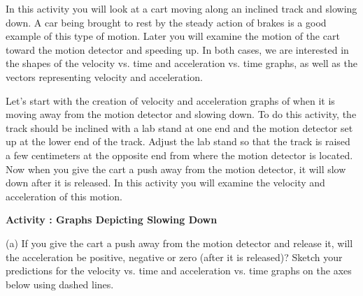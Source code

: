 In this activity you will look at a cart moving along an inclined track and
slowing down. A car being brought to rest by the steady action of brakes is
a good example of this type of motion. Later you will examine the motion of
the cart toward the motion detector and speeding up. In both cases, we are interested
in the shapes of the velocity vs. time and acceleration vs. time graphs, as
well as the vectors representing velocity and acceleration. 

Let's start with the creation of velocity and acceleration graphs of when it
is moving away from the motion detector and slowing down. To do this activity,
the track should be inclined with a lab stand at one end and the motion detector set up at the lower end of the track. Adjust the lab stand so that the track is raised a few centimeters at the opposite end from where the motion detector is located. Now when you give the cart a push away from the motion detector, it will slow down after it is released. In this activity you will examine the velocity and acceleration of this motion.

\textbf{Activity : Graphs Depicting Slowing Down} 

(a) If you give the cart a push away from the motion detector and release it,
will the acceleration be positive, negative or zero (after it is released)?
Sketch your predictions for the velocity vs. time and acceleration vs. time
graphs on the axes below using dashed lines.

